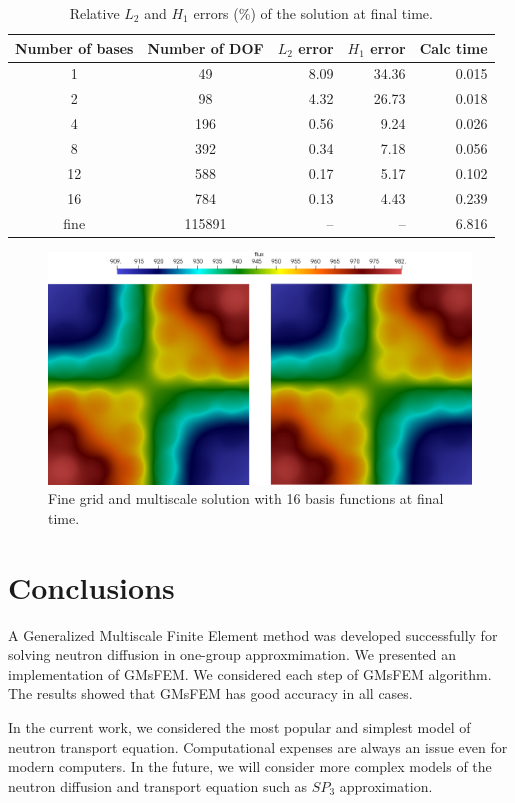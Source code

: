 \documentclass[runningheads]{llncs}
\begin{document}
\begin{table}[h!]
\caption{Relative $L_2$ and $H_1$ errors ($\%$) of the solution at final time.}
\label{t2}
\begin{center}
\begin{tabular}{|c|c|r|r|r|}
\hline
Number of bases & Number of DOF & $L_2$ error & $H_1$ error & Calc time\\
\hline
1 & 49 & 8.09 & 34.36 & 0.015 \\
2 & 98 & 4.32 & 26.73 & 0.018 \\
4 & 196 & 0.56 & 9.24 & 0.026 \\
8 & 392 & 0.34 & 7.18 & 0.056 \\
12 & 588 & 0.17 & 5.17 & 0.102 \\
16 & 784 & 0.13 & 4.43 & 0.239 \\
fine & 115891 & -- & -- & 6.816 \\
\hline
\end{tabular}
\end{center}
\end{table}

\begin{figure}[h!]
\centering
\includegraphics[width=0.75\linewidth]{flux.png} 
\caption{Fine grid and multiscale solution with 16 basis functions at final time.}
\label{p6}
\end{figure} 

\section{Conclusions}
A Generalized Multiscale Finite Element method was developed successfully for solving neutron diffusion in one-group approxmimation.  
We presented an implementation of GMsFEM. 
We considered each step of GMsFEM algorithm.
The results showed that GMsFEM has good accuracy in all cases.

In the current work, we considered the most popular and simplest model of neutron transport equation.
Computational expenses are always an issue even for modern computers.
In the future, we will consider more complex models of the neutron diffusion and transport equation such as $SP_3$ approximation. 
\end{document}
